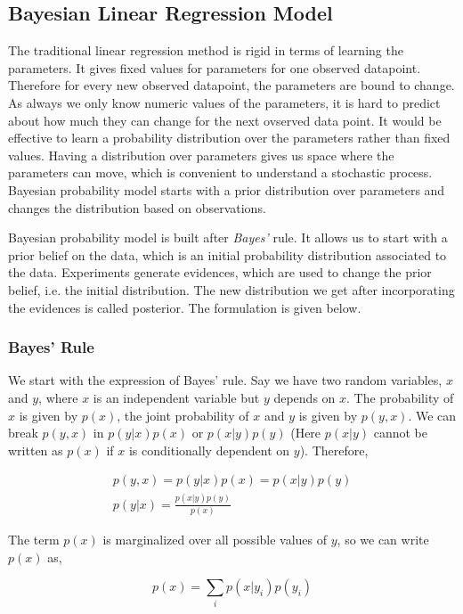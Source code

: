 \documentclass[english]{tktltiki}
\begin{document}
\subsection{Bayesian Linear Regression Model}

The traditional linear regression method is rigid in terms of learning the parameters. It gives fixed values for parameters for one observed datapoint. Therefore for every new observed datapoint, the parameters are bound to change. As always we only know numeric values of the parameters, it is hard to predict about how much they can change for the next ovserved data point.  It would be effective to learn a probability distribution over the parameters rather than fixed values. Having a distribution over parameters gives us space where the parameters can move, which is convenient to understand a stochastic process. Bayesian probability model starts with a prior distribution over parameters and changes the distribution based on observations.

Bayesian probability model is built after \textit{Bayes'} rule. It allows us to start with a prior belief on the data, which is an initial probability distribution associated to the data. Experiments generate evidences, which are used to change the prior belief, i.e. the initial distribution. The new distribution we get after incorporating the evidences is called posterior. The formulation is given below.

\subsubsection{Bayes' Rule}

We start with the expression of Bayes' rule. Say we have two random variables, $x$ and $y$, where $x$ is an independent variable but $y$ depends on $x$. The probability of $x$ is given by $p(x)$, the joint probability of $x$ and $y$ is given by $p(y, x)$. We can break $p(y, x)$ in $p(y|x)p(x)$ or $p(x|y)p(y)$ (Here $p(x|y)$ cannot be written as $p(x)$ if $x$ is conditionally dependent on $y$). Therefore,

\begin{eqnarray}
p(y, x) = p(y|x)p(x) = p(x|y)p(y)\nonumber\\
p(y|x) = \frac{p(x|y)p(y)}{p(x)}
\end{eqnarray}


The term $p(x)$ is marginalized over all possible values of $y$, so we can write $p(x)$ as,

\begin{equation}
p(x) = \sum_i{p(x|y_i)p(y_i)}
\end{equation}
\end{document}
